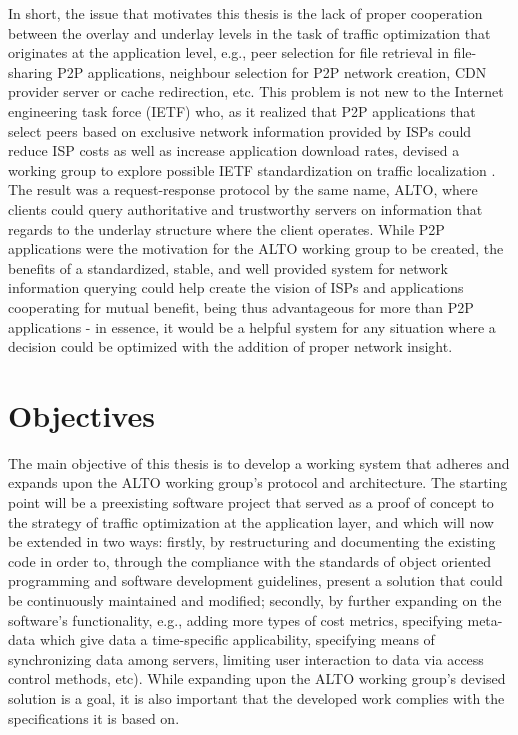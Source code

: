 \documentclass[
  oneside,
  11pt, a4paper,
  footinclude=true,
  headinclude=true,
  cleardoublepage=empty
]{scrbook}
\begin{document}
    In short, the issue that motivates this thesis is the lack of proper cooperation between the overlay and underlay levels in the task of traffic optimization that originates at the application level, e.g., peer selection for file retrieval in file-sharing P2P applications, neighbour selection for P2P network creation, CDN provider server or cache redirection, etc. This problem is not new to the Internet engineering task force (IETF) who, as it realized that P2P applications that select peers based on exclusive network information provided by ISPs could reduce ISP costs as well as increase application download rates, devised a working group to explore possible IETF standardization on traffic localization \cite{seedorf2009}. The result was a request-response protocol by the same name, ALTO, where clients could query authoritative and trustworthy servers on information that regards to the underlay structure where the client operates. While P2P applications were the motivation for the ALTO working group to be created, the benefits of a standardized, stable, and well provided system for network information querying could help create the vision of ISPs and applications cooperating for mutual benefit, being thus advantageous for more than P2P applications - in essence, it would be a helpful system for any situation where a decision could be optimized with the addition of proper network insight.
    
    \section{Objectives}
    The main objective of this thesis is to develop a working system that adheres and expands upon the ALTO working group's protocol and architecture. The starting point will be a preexisting software project that served as a proof of concept to the strategy of traffic optimization at the application layer, and which will now be extended in two ways: firstly, by restructuring and documenting the existing code in order to, through the compliance with the standards of object oriented programming and software development guidelines, present a solution that could be continuously maintained and modified; secondly, by further expanding on the software's functionality, e.g., adding more types of cost metrics, specifying meta-data which give data a time-specific applicability, specifying means of synchronizing data among servers, limiting user interaction to data via access control methods, etc). While expanding upon the ALTO working group's devised solution is a goal, it is also important that the developed work complies with the specifications it is based on.
    
\end{document}
